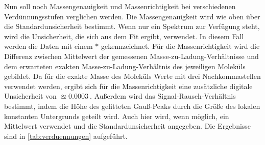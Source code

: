 Nun soll noch Massengenauigkeit und Massenrichtigkeit bei verschiedenen Verdünnungsstufen verglichen werden.
Die Massengenauigkeit wird wie oben über die Standardunsicherheit bestimmt.
Wenn nur ein Spektrum zur Verfügung steht, wird die Unsicherheit, die sich aus dem Fit ergibt, verwendet.
In diesem Fall werden die Daten mit einem $*$ gekennzeichnet.
Für die Massenrichtigkeit wird die Differenz zwischen Mittelwert der gemessenen Masse-zu-Ladung-Verhältnisse und dem erwarteten exakten Masse-zu-Ladung-Verhältnis des jeweiligen Moleküls gebildet.
Da für die exakte Masse des Moleküls Werte mit drei Nachkommastellen verwendet werden, ergibt sich für die Massenrichtigkeit eine zusätzliche digitale Unsicherheit von $\approxeq \SI{0.0003}{}$.
Außerdem wird das Signal-Rausch-Verhältnis bestimmt, indem die Höhe des gefitteten Gauß-Peaks durch die Größe des lokalen konstanten Untergrunds geteilt wird.
Auch hier wird, wenn möglich, ein Mittelwert verwendet und die Standardunsicherheit angegeben.
Die Ergebnisse sind in \cref{tab:verduennungen} aufgeführt.

